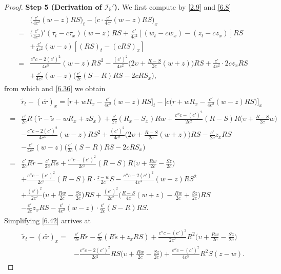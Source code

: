 \documentclass[10pt,a4paper]{amsart}
\newcommand{\fr}{\frac}
\begin{document}
\begin{proof}
\textbf{Step 5 (Derivation of $\mathcal{I}_{5}'$).} We first compute by \eqref{2.9} and \eqref{6.8}
\begin{align*}
\begin{split}
&\Big(\fr{c'}{4c^2}(w-z)RS\Big)_t-\Big(c\cdot\fr{c'}{4c^2}(w-z)RS\Big)_x \\
=& \Big(\fr{c'}{4c^2}\Big)' (\tau_t-c\tau_x)(w-z)RS +\fr{c'}{4c^2}[(w_t-cw_x)-(z_t-cz_x)]RS \\ &+\fr{c'}{4c^2}(w-z)[(RS)_t-(cRS)_x] \\
=&\fr{c''c-2(c')^2}{4c^3}(w-z)RS^2 -\fr{(c')^2}{4c^2}\Big(2\upsilon+\fr{R-S}{2c}(w+z)\Big)RS +\fr{c'}{4c^2}\cdot 2cz_xRS \\
&+\fr{c'}{4c^2}(w-z)\Big(\fr{c'}{2c}(S-R)RS-2cRS_x\Big),
\end{split}
\end{align*}
from which and \eqref{6.36} we obtain
\begin{align}\label{6.42}
\begin{split}
&\tilde{r}_t-(c\tilde{r})_x=\Big[r+wR_x-\fr{c'}{4c^2}(w-z)RS\Big]_t -\Big[c\Big(r+wR_x-\fr{c'}{4c^2}(w-z)RS\Big)\Big]_x \\
=& \fr{c'}{2c}R(\tilde{r}-\tilde{s}-wR_x+zS_x) +\fr{c'}{2c}(R_x-S_x)Rw +\fr{c''c-(c')^2}{2c^2}(R-S)R\Big(\upsilon+\fr{R-S}{2c}w\Big) \\
&-\fr{c''c-2(c')^2}{4c^3}(w-z)RS^2 +\fr{(c')^2}{4c^2}\Big(2\upsilon+\fr{R-S}{2c}(w+z)\Big)RS -\fr{c'}{2c}z_xRS \\
&-\fr{c'}{4c^2}(w-z)\Big(\fr{c'}{2c}(S-R)RS-2cRS_x\Big) \\
=& \fr{c'}{2c}R\tilde{r}-\fr{c'}{2c}R\tilde{s}  +\fr{c''c-(c')^2}{2c^2}(R-S)R\Big(\upsilon+\fr{Rw}{2c}-\fr{Sz}{2c}\Big)  \\
&+\fr{c''c-(c')^2}{2c^2}(R-S)R \cdot\fr{z-w}{2c}S  -\fr{c''c-2(c')^2}{4c^3}(w-z)RS^2 \\
&+\fr{(c')^2}{2c^2}\Big(\upsilon+\fr{Rw}{2c}- \fr{Sz}{2c}\Big)RS+\fr{(c')^2}{2c^2}\Big(\fr{R-S}{4c}(w+z)-\fr{Rw}{2c}+ \fr{Sz}{2c}\Big)RS \\
&-\fr{c'}{2c}z_xRS-\fr{c'}{4c^2}(w-z)\cdot\fr{c'}{2c}(S-R)RS.
\end{split}
\end{align}
Simplifying \eqref{6.42} arrives at
\begin{align}\label{6.43}
\begin{split}
\tilde{r}_t-(c\tilde{r})_x
=& \fr{c'}{2c}R\tilde{r} -\fr{c'}{2c}(R\tilde{s}+ z_xRS) +\fr{c''c-(c')^2}{2c^2}R^2\Big(\upsilon+\fr{Rw}{2c}-\fr{Sz}{2c}\Big) \\ &-\fr{c''c-2(c')^2}{2c^2}RS\Big(\upsilon+\fr{Rw}{2c}-\fr{Sz}{2c}\Big) +\fr{c''c-(c')^2}{4c^3}R^2S(z-w).

\end{split}
\end{align}
\end{proof}
\end{document}
